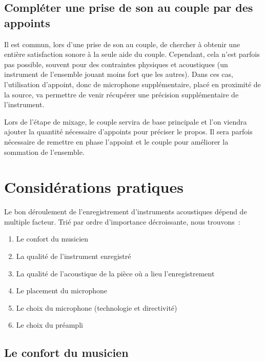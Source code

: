 \documentclass[
]{book}
\providecommand{\tightlist}{%
  \setlength{\itemsep}{0pt}\setlength{\parskip}{0pt}}
\begin{document}
\hypertarget{compluxe9ter-une-prise-de-son-au-couple-par-des-appoints}{%
\section{Compléter une prise de son au couple par des appoints}\label{compluxe9ter-une-prise-de-son-au-couple-par-des-appoints}}

Il est commun, lors d'une prise de son au couple, de chercher à obtenir une entière satisfaction sonore à la seule aide du couple. Cependant, cela n'est parfois pas possible, souvent pour des contraintes physiques et acoustiques (un instrument de l'ensemble jouant moins fort que les autres). Dans ces cas, l'utilisation d'appoint, donc de microphone supplémentaire, placé en proximité de la source, va permettre de venir récupérer une précision supplémentaire de l'instrument.

Lors de l'étape de mixage, le couple servira de base principale et l'on viendra ajouter la quantité nécessaire d'appoints pour préciser le propos. Il sera parfois nécessaire de remettre en phase l'appoint et le couple pour améliorer la sommation de l'ensemble.

\hypertarget{considuxe9rations-pratiques}{%
\chapter{Considérations pratiques}\label{considuxe9rations-pratiques}}

Le bon déroulement de l'enregistrement d'instruments acoustiques dépend de multiple facteur. Trié par ordre d'importance décroissante, nous trouvons~:

\begin{enumerate}
\def\labelenumi{\arabic{enumi}.}
\tightlist
\item
  Le confort du musicien
\item
  La qualité de l'instrument enregistré
\item
  La qualité de l'acoustique de la pièce où a lieu l'enregistrement
\item
  Le placement du microphone
\item
  Le choix du microphone (technologie et directivité)
\item
  Le choix du préampli
\end{enumerate}

\hypertarget{le-confort-du-musicien}{%
\section{Le confort du musicien}\label{le-confort-du-musicien}}
\end{document}
